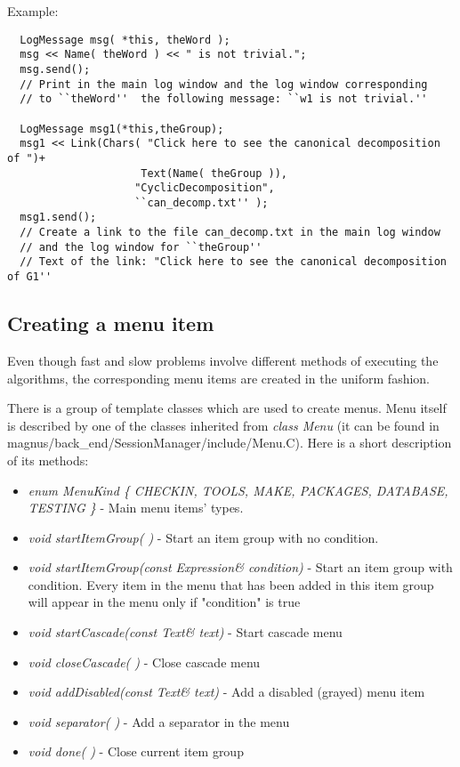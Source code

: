 \documentclass[12pt]{article}
\begin{document}
  Example:

  \footnotesize
  \begin{verbatim}
  LogMessage msg( *this, theWord );
  msg << Name( theWord ) << " is not trivial.";
  msg.send();
  // Print in the main log window and the log window corresponding 
  // to ``theWord''  the following message: ``w1 is not trivial.''

  LogMessage msg1(*this,theGroup);
  msg1 << Link(Chars( "Click here to see the canonical decomposition of ")+
                     Text(Name( theGroup )),
                    "CyclicDecomposition",
                    ``can_decomp.txt'' );
  msg1.send();   
  // Create a link to the file can_decomp.txt in the main log window 
  // and the log window for ``theGroup''
  // Text of the link: "Click here to see the canonical decomposition of G1''

  \end{verbatim}
  \normalsize

  \subsection{Creating a menu item}
  Even though  fast and slow problems  involve different methods of 
  executing the algorithms, the corresponding menu items are created in the 
  uniform fashion.
   
  There is a group of template classes which are used to create menus.
  Menu itself is described by one of the classes inherited from \emph{class Menu} 
  (it can be
  found in magnus/back\_end/SessionManager/include/Menu.C).
  Here is a short description of its methods:
  \begin{itemize}
   
  \item \emph{ enum MenuKind \{ CHECKIN, TOOLS, MAKE, PACKAGES, DATABASE, TESTING 
  \}} - 
          Main menu items' types. 
    
  \item \emph{  void startItemGroup( ) } - Start an item group with no condition.

   
  \item \emph{ void startItemGroup(const Expression\& condition)} - Start an item 
  group with condition.
    Every item in the menu that has been added in this item group
      will appear in the menu only if "condition" is true 


  \item \emph{  void startCascade(const Text\& text)} - Start cascade menu

  \item \emph{  void closeCascade( ) }- Close cascade menu

  \item \emph{ void addDisabled(const Text\& text)} - Add a disabled (grayed) menu 
  item

  \item \emph{  void separator( ) } -  Add a separator in the menu

  \item \emph{  void done( )} - Close current item group
  \end{itemize}
\end{document}
